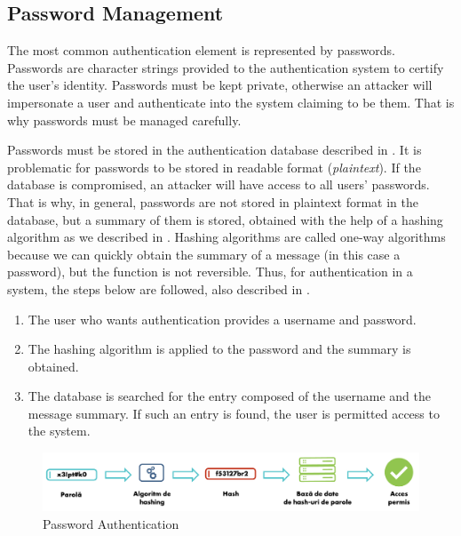 \subsection{Password Management}
\label{sec:sec:auth:password}

The most common authentication element is represented by passwords.
Passwords are character strings provided to the authentication system to certify the user's identity.
Passwords must be kept private, otherwise an attacker will impersonate a user and authenticate into the system claiming to be them.
That is why passwords must be managed carefully.

Passwords must be stored in the authentication database described in .
It is problematic for passwords to be stored in readable format (\textit{plaintext}).
If the database is compromised, an attacker will have access to all users' passwords.
That is why, in general, passwords are not stored in plaintext format in the database, but a summary of them is stored, obtained with the help of a hashing algorithm as we described in .
Hashing algorithms are called one-way algorithms because we can quickly obtain the summary of a message (in this case a password), but the function is not reversible.
Thus, for authentication in a system, the steps below are followed, also described in .

\begin{enumerate}
  \item The user who wants authentication provides a username and password.
  \item The hashing algorithm is applied to the password and the summary is obtained.
  \item The database is searched for the entry composed of the username and the message summary.
    If such an entry is found, the user is permitted access to the system.
\end{enumerate}

\begin{figure}[htbp]
  \centering
  \def\svgwidth{\columnwidth}
  \includegraphics{chapters/12-auth/img/password-auth-hashing.svg.pdf}
  \caption{Password Authentication}
  \label{fig:sec:password-auth-hashing}
\end{figure}

